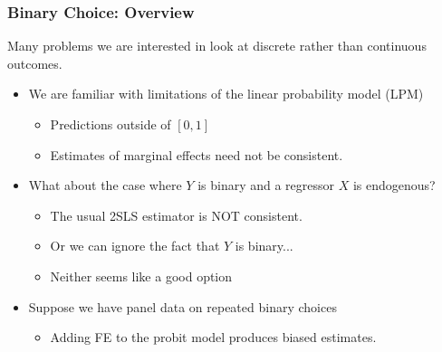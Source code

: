 \documentclass[aspectratio=169]{beamer}
\begin{document}


\begin{frame}
\frametitle{Binary Choice: Overview}
Many problems we are interested in look at discrete rather than continuous outcomes.
\begin{itemize}
\item We are familiar with limitations of the linear probability model (LPM)
\begin{itemize}
\item Predictions outside of $[0,1]$
\item Estimates of marginal effects need not be consistent.
\end{itemize}
\item What about the case where $Y$ is binary and a regressor $X$ is endogenous?
\begin{itemize}
\item The usual 2SLS estimator is \alert{NOT consistent}.
\item Or we can ignore the fact that $Y$ is binary...
\item Neither seems like a good option
\end{itemize}
\item Suppose we have panel data on repeated binary choices
\begin{itemize}
\item Adding FE to the probit model produces biased estimates.
\end{itemize}
\end{itemize}
\end{frame}
\end{document}
